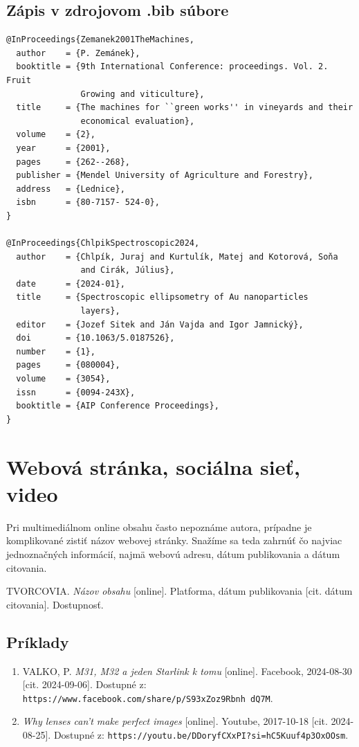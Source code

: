 \subsection*{\normalsize Zápis v zdrojovom .bib súbore}
\begin{verbatim}
@InProceedings{Zemanek2001TheMachines,
  author    = {P. Zemánek},
  booktitle = {9th International Conference: proceedings. Vol. 2. Fruit
               Growing and viticulture},
  title     = {The machines for ``green works'' in vineyards and their
               economical evaluation},
  volume    = {2},
  year      = {2001},
  pages     = {262--268},
  publisher = {Mendel University of Agriculture and Forestry},
  address   = {Lednice},
  isbn      = {80-7157- 524-0},
}

@InProceedings{ChlpikSpectroscopic2024,
  author    = {Chlpík, Juraj and Kurtulík, Matej and Kotorová, Soňa
               and Cirák, Július},
  date      = {2024-01},
  title     = {Spectroscopic ellipsometry of Au nanoparticles
               layers},
  editor    = {Jozef Sitek and Ján Vajda and Igor Jamnický},
  doi       = {10.1063/5.0187526},
  number    = {1},
  pages     = {080004},
  volume    = {3054},
  issn      = {0094-243X},
  booktitle = {AIP Conference Proceedings},
}
\end{verbatim}

\section{Webová stránka, sociálna sieť, video}
Pri multimediálnom online obsahu často nepoznáme autora,
prípadne je komplikované zistiť názov webovej stránky.
Snažíme sa teda zahrnúť čo najviac jednoznačných informácií,
najmä webovú adresu, dátum publikovania a dátum citovania.
\begin{trivlist}
  \item TVORCOVIA. \textit{Názov obsahu} [online]. Platforma, dátum publikovania [cit. dátum citovania]. Dostupnosť.
\end{trivlist}

\subsection*{\normalsize Príklady}
\begin{enumerate}
  \item VALKO, P. \textit{M31, M32 a jeden Starlink k tomu} [online]. Facebook, 2024-08-30 [cit. 2024-09-06]. Dostupné z: \texttt{https://www.facebook.com/share/p/S93xZoz9Rbnh
  dQ7M}.

  \item \textit{Why lenses can't make perfect images} [online]. Youtube, 2017-10-18 [cit. 2024-08-25]. Dostupné z: \texttt{https://youtu.be/DDoryfCXxPI?si=hC5Kuuf4p3OxOOsm}.
\end{enumerate}

